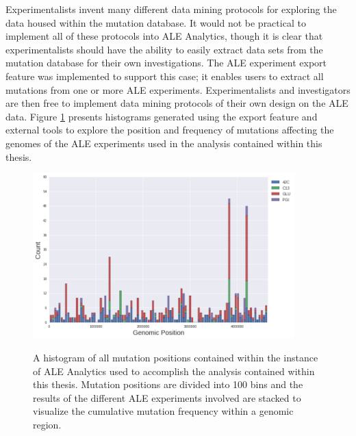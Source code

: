 \documentclass[12pt,final,masters,chapterheads]{ucsd}  %
\begin{document}
Experimentalists invent many different data mining protocols for exploring the data housed within the mutation database. It would not be practical to implement all of these protocols into ALE Analytics, though it is clear that experimentalists should have the ability to easily extract data sets from the mutation database for their own investigations. The ALE experiment export feature was implemented to support this case; it enables users to extract all mutations from one or more ALE experiments. Experimentalists and investigators are then free to implement data mining protocols of their own design on the ALE data. Figure \ref{fig:all_muts_topo} presents histograms generated using the export feature and external tools to explore the position and frequency of mutations affecting the genomes of the ALE experiments used in the analysis contained within this thesis.
\begin{figure}[H]
  \caption{A histogram of all mutation positions contained within the instance of ALE Analytics used to accomplish the analysis contained within this thesis. Mutation positions are divided into 100 bins and the results of the different ALE experiments involved are stacked to visualize the cumulative mutation frequency within a genomic region.}
  \centering
  \includegraphics[width=0.9\textwidth]{all_muts_topo.png}
  \label{fig:all_muts_topo}
\end{figure}
\end{document}

